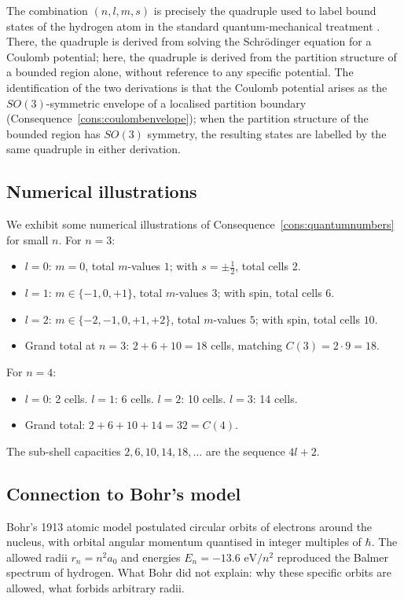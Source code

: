 \documentclass[11pt,twocolumn,a4paper]{article}
\theoremstyle{axiomstyle}
\theoremstyle{conseqstyle}
\theoremstyle{definition}
\theoremstyle{remark}
\begin{document}
The combination $(n,l,m,s)$ is precisely the quadruple used to label bound states of the hydrogen atom in the standard quantum-mechanical treatment \citep{griffiths2018,sakurai2017}. There, the quadruple is derived from solving the Schr\"odinger equation for a Coulomb potential; here, the quadruple is derived from the partition structure of a bounded region alone, without reference to any specific potential. The identification of the two derivations is that the Coulomb potential arises as the $SO(3)$-symmetric envelope of a localised partition boundary (Consequence~\ref{cons:coulombenvelope}); when the partition structure of the bounded region has $SO(3)$ symmetry, the resulting states are labelled by the same quadruple in either derivation.

\subsection{Numerical illustrations}

We exhibit some numerical illustrations of Consequence~\ref{cons:quantumnumbers} for small $n$. For $n=3$:
\begin{itemize}
\item $l=0$: $m=0$, total $m$-values $1$; with $s=\pm\tfrac{1}{2}$, total cells $2$.
\item $l=1$: $m\in\{-1,0,+1\}$, total $m$-values $3$; with spin, total cells $6$.
\item $l=2$: $m\in\{-2,-1,0,+1,+2\}$, total $m$-values $5$; with spin, total cells $10$.
\item Grand total at $n=3$: $2+6+10=18$ cells, matching $C(3)=2\cdot 9=18$.
\end{itemize}

For $n=4$:
\begin{itemize}
\item $l=0$: 2 cells. $l=1$: 6 cells. $l=2$: 10 cells. $l=3$: 14 cells.
\item Grand total: $2+6+10+14=32=C(4)$.
\end{itemize}

The sub-shell capacities $2, 6, 10, 14, 18, \ldots$ are the sequence $4l+2$.

\subsection{Connection to Bohr's model}

Bohr's 1913 atomic model \citep{bohr1913} postulated circular orbits of electrons around the nucleus, with orbital angular momentum quantised in integer multiples of $\hbar$. The allowed radii $r_{n}=n^{2}a_{0}$ and energies $E_{n}=-13.6\text{ eV}/n^{2}$ reproduced the Balmer spectrum of hydrogen. What Bohr did not explain: why these specific orbits are allowed, what forbids arbitrary radii.
\end{document}
